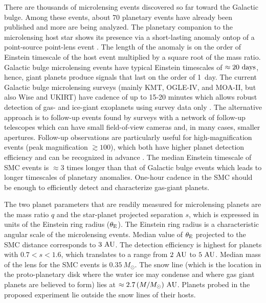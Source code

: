 \documentclass[12pt,letterpaper]{article}
\begin{document}
There are thousands of microlensing events discovered so far toward 
the Galactic bulge.  Among these events, about 70 planetary events have 
already been published and more are being analyzed.  
The planetary companion to the microlensing host star shows its presence via 
a short-lasting anomaly \citep{mao91,gould92} ontop of 
a point-source point-lens event \citep{paczynski86}.  The length of 
the anomaly is on the order of Einstein timescale of the host event 
multiplied by a square root of the mass ratio.  Galactic bulge microlensing 
events have typical Einstein timescales of $\approx20~{\rm days}$, hence, 
giant planets produce signals that last on the order of 1~day.  
The current Galactic bulge microlensing surveys 
(mainly KMT, OGLE-IV, and MOA-II, but also Wise and UKIRT) 
have cadence of up to 15-20 minutes which allows robust detection of gas- and ice-giant 
exoplanets using survey data only \citep[e.g.,][]{yee12,poleski14c,shvartzvald16a}.  
The alternative approach is to follow-up events found by surveys with a network of 
follow-up telescopes which can have small field-of-view cameras and, 
in many cases, smaller apertures.  Follow-up observations are particularly useful for 
high-magnification events (peak magnification $\gtrsim100$), 
which both have higher planet detection efficiency and can be 
recognized in advance \citep{griest98,gould10}.  The median Einstein timescale of 
SMC events is $\approx3$ times longer than that of Galactic bulge events which leads to 
longer timescales of planetary anomalies.  One-hour cadence in the SMC 
should be enough to efficiently detect and characterize gas-giant planets.  

The two planet parameters that are readily measured for microlensing planets 
are the mass ratio $q$ and the star-planet projected separation $s$, 
which is expressed in units of the Einstein ring radius ($\theta_{\rm E}$).  
The Einstein ring radius is a characteristic angular scale of 
the microlensing events.  Median value of $\theta_{\rm E}$ projected 
to the SMC distance corresponds to $3~{\rm AU}$.  The detection efficiency 
is highest for planets with $0.7 < s < 1.6$, which translates to 
a range from $2~{\rm AU}$ to $5~{\rm AU}$.  Median mass of the lens for 
the SMC events is $0.35~M_{\odot}$.
The snow line (which is the location in the proto-planetary disk where the water 
ice may condense and where gas giant planets are believed to form) lies at 
$\approx 2.7 \left(M/M_{\odot}\right)\,{\rm AU}$. Planets 
probed in the proposed experiment lie outside the snow lines of their hosts. 
\end{document}
